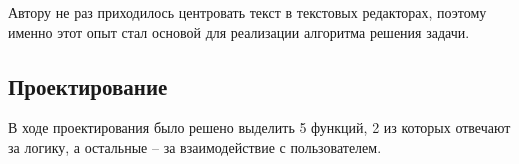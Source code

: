 \documentclass[12pt,a4paper]{report}
\begin{document}
\hspace{\parindent}
Автору не раз приходилось центровать текст в текстовых редакторах, поэтому именно этот опыт стал основой для реализации алгоритма решения задачи.
\subsection{Проектирование}
\hspace{\parindent}
В ходе проектирования было решено выделить 5 функций, 2 из которых отвечают за логику, а остальные -- за взаимодействие с пользователем.
\end{document}
